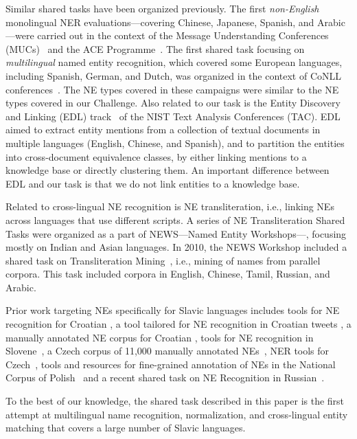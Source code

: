 \documentclass[11pt]{article}
\begin{document}
Similar shared tasks have been organized previously.  The first {\em non-English} monolingual
NER evaluations---covering Chinese, Japanese, Spanish, and Arabic---were carried out in the
context of the Message Understanding Conferences (MUCs)~\cite{chinchor:98} and the ACE
Programme~\cite{conf/lrec/DoddingtonMPRSW04}.  The first shared task focusing on
\emph{multilingual} named entity recognition, which covered some European languages, including
Spanish, German, and Dutch, was organized in the context of CoNLL
conferences~\cite{TjongKimSang:2002:ICS:1118853.1118877,TjongKimSang:2003:ICS:1119176.1119195}.
The NE types covered in these campaigns were similar to the NE types covered in our Challenge.
%
Also related to our task is the Entity Discovery and Linking (EDL)
track~\cite{ji:ea:2014,ji:ea:2015} of the NIST Text Analysis Conferences (TAC).  EDL aimed to
extract entity mentions from a collection of textual documents in multiple languages (English,
Chinese, and Spanish), and to partition the entities into cross-document equivalence classes,
by either linking mentions to a knowledge base or directly clustering them.  An important
difference between EDL and our task is that we do not link entities to a knowledge base.

Related to cross-lingual NE recognition is NE transliteration, i.e., linking NEs across
languages that use different scripts.  A series of NE Transliteration Shared Tasks were
organized as a part of NEWS---Named Entity Workshops---\cite{duan2016report}, focusing mostly
on Indian and Asian languages.  In 2010, the NEWS Workshop included a shared task on
Transliteration Mining~\cite{kumaran2010report}, i.e., mining of names from parallel corpora.
This task included corpora in English, Chinese, Tamil, Russian, and Arabic.

Prior work targeting NEs specifically for Slavic languages includes tools for NE recognition
for Croatian \cite{karan2013croner,ljubesic2013combining}, a tool tailored for NE recognition
in Croatian tweets \cite{baksa2017tagging}, a manually annotated NE corpus for Croatian
\cite{agic2014setimes}, tools for NE recognition in
Slovene~\cite{stajner2013razpoznavanje,ljubesic2013combining}, a Czech corpus of 11,000
manually annotated NEs~\cite{vsevvcikova2007named}, NER tools for Czech~\cite{Konkol:2013},
tools and resources for fine-grained annotation of NEs in the National Corpus of
Polish~\cite{was:etal:10,sav:pis:11} and a recent shared task on NE Recognition in
Russian~\cite{alexeeva2016factrueval}.

To the best of our knowledge, the shared task described in this paper is the first attempt at
multilingual name recognition, normalization, and cross-lingual entity matching that covers a
large number of Slavic languages.
\end{document}
